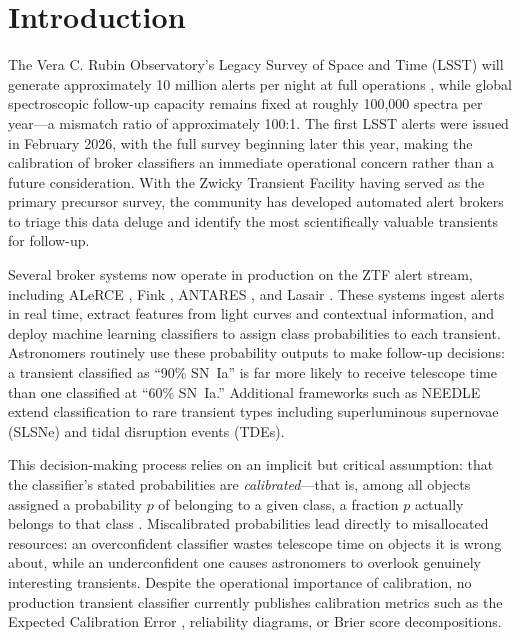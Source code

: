 \documentclass[twocolumn]{aastex631}
\begin{document}

\section{Introduction} \label{sec:intro}

The Vera C. Rubin Observatory's Legacy Survey of Space and Time (LSST) will generate approximately 10 million alerts per night at full operations \citep{ivezic2019}, while global spectroscopic follow-up capacity remains fixed at roughly 100,000 spectra per year---a mismatch ratio of approximately 100:1. The first LSST alerts were issued in February 2026, with the full survey beginning later this year, making the calibration of broker classifiers an immediate operational concern rather than a future consideration. With the Zwicky Transient Facility \citep[ZTF;][]{bellm2019} having served as the primary precursor survey, the community has developed automated alert brokers to triage this data deluge and identify the most scientifically valuable transients for follow-up.

Several broker systems now operate in production on the ZTF alert stream, including ALeRCE \citep{forster2021}, Fink \citep{moller2021}, ANTARES \citep{narayan2018}, and Lasair \citep{smith2019}. These systems ingest alerts in real time, extract features from light curves and contextual information, and deploy machine learning classifiers to assign class probabilities to each transient. Astronomers routinely use these probability outputs to make follow-up decisions: a transient classified as ``90\% SN~Ia'' is far more likely to receive telescope time than one classified at ``60\% SN~Ia.'' Additional frameworks such as NEEDLE \citep{sheng2024} extend classification to rare transient types including superluminous supernovae (SLSNe) and tidal disruption events (TDEs).

This decision-making process relies on an implicit but critical assumption: that the classifier's stated probabilities are \emph{calibrated}---that is, among all objects assigned a probability $p$ of belonging to a given class, a fraction $p$ actually belongs to that class \citep{dawid1982}. Miscalibrated probabilities lead directly to misallocated resources: an overconfident classifier wastes telescope time on objects it is wrong about, while an underconfident one causes astronomers to overlook genuinely interesting transients. Despite the operational importance of calibration, no production transient classifier currently publishes calibration metrics such as the Expected Calibration Error \citep[ECE;][]{naeini2015}, reliability diagrams, or Brier score decompositions.
\end{document}
